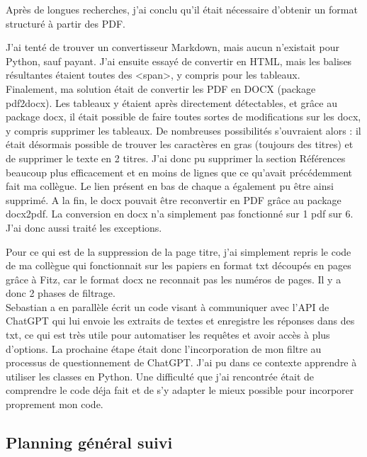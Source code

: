 Après de longues recherches, j'ai conclu qu'il était nécessaire d'obtenir un format structuré à partir des PDF.

J'ai tenté de trouver un convertisseur Markdown, mais aucun n'existait pour Python, sauf payant.
J'ai ensuite essayé de convertir en HTML, mais les balises résultantes étaient toutes des <span>, y compris pour les tableaux.
\\

Finalement, ma solution était de convertir les PDF en DOCX (package pdf2docx). 
Les tableaux y étaient après directement détectables, et grâce au package docx, il était possible de faire toutes sortes de modifications sur les docx, y compris supprimer les tableaux.
De nombreuses possibilités s'ouvraient alors : il était désormais possible de trouver les caractères en gras (toujours des titres) et de supprimer le texte en 2 titres.
J'ai donc pu supprimer la section Références beaucoup plus efficacement et en moins de lignes que ce qu'avait précédemment fait ma collègue.
Le lien présent en bas de chaque a également pu être ainsi supprimé.
A la fin, le docx pouvait être reconvertir en PDF grâce au package docx2pdf.
La conversion en docx n'a simplement pas fonctionné sur 1 pdf sur 6. J'ai donc aussi traité les exceptions.

Pour ce qui est de la suppression de la page titre, j'ai simplement repris le code de ma collègue qui fonctionnait sur les papiers en format txt découpés en pages grâce à Fitz, car le format docx ne reconnait pas les numéros de pages. 
Il y a donc 2 phases de filtrage.
\\

Sebastian a en parallèle écrit un code visant à communiquer avec l'API de ChatGPT qui lui envoie les extraits de textes et enregistre les réponses dans des txt, ce qui est très utile pour automatiser les requêtes et avoir accès à plus d'options.
La prochaine étape était donc l'incorporation de mon filtre au processus de questionnement de ChatGPT.
J'ai pu dans ce contexte apprendre à utiliser les classes en Python.
Une difficulté que j'ai rencontrée était de comprendre le code déja fait et de s'y adapter le mieux possible pour incorporer proprement mon code.

\subsection{Planning général suivi}